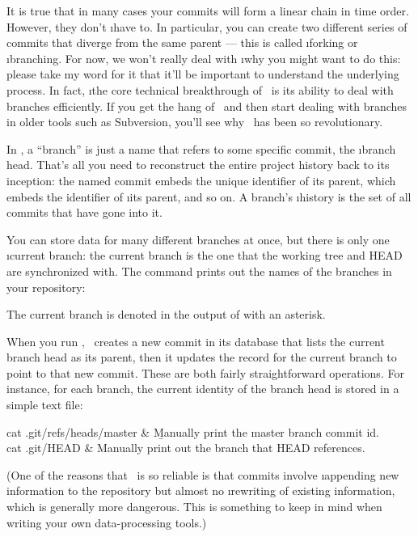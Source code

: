 \documentclass[letterpaper,12pt,titlepage,twoside]{article}
\begin{document}
It is true that in many cases your commits will form a linear chain in time
order. However, they don't \i{have} to. In particular, you can create two
different series of commits that diverge from the same parent --- this is
called \i{forking} or \i{branching}. For now, we won't really deal with
\i{why} you might want to do this: please take my word for it that it'll be
important to understand the underlying process. In fact, \i{the core technical
  breakthrough of \git\ is its ability to deal with branches efficiently.} If
you get the hang of \git\ and then start dealing with branches in older tools
such as Subversion, you'll see why \git\ has been so revolutionary.

In \git, a ``branch'' is just a name that refers to some specific commit, the
\i{branch head}. That's all you need to reconstruct the entire project history
back to its inception: the named commit embeds the unique identifier of its
parent, which embeds the identifier of \i{its} parent, and so on. A branch's
\i{history} is the set of all commits that have gone into it.

You can store data for many different branches at once, but there is only one
\i{current branch}: the current branch is the one that the working tree and
HEAD are synchronized with. The  command prints out the names of
the branches in your repository:


The current branch is denoted in the output of  with an asterisk.


When you run , \git\ creates a new commit in its database that
lists the current branch head as its parent, then it updates the record for
the current branch to point to that new commit. These are both fairly
straightforward operations. For instance, for each branch, the current
identity of the branch head is stored in a simple text file:

\begin{typeme}
cat .git/refs/heads/master & \b{Manually print the master branch commit id.} \\
cat .git/HEAD & Manually print out the branch that HEAD references.
\end{typeme}

(One of the reasons that \git\ is so reliable is that commits involve
\i{appending} new information to the repository but almost no \i{rewriting} of
existing information, which is generally more dangerous. This is something to
keep in mind when writing your own data-processing tools.)
\end{document}
